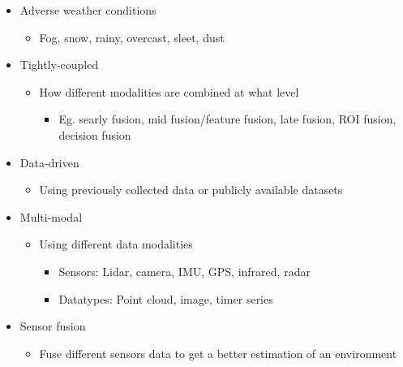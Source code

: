 \documentclass[rnd]{mas_proposal}
\begin{document}
\begin{itemize}
\begin{itemize}
            \item {Adverse weather conditions}
            \begin{itemize}
                \item Fog, snow, rainy, overcast, sleet, dust
            \end{itemize}
        
            \item {Tightly-coupled}
            \begin{itemize}
                \item How different modalities are combined at what level
                \begin{itemize}
                    \item Eg. searly fusion, mid fusion/feature fusion, late fusion, ROI fusion, decision fusion
                \end{itemize}
            \end{itemize}
        
            \item {Data-driven}
            \begin{itemize}
                \item Using previously collected data or publicly available datasets
            \end{itemize}
        
            \item {Multi-modal}
            \begin{itemize}
                \item Using different data modalities
                \begin{itemize}
                    \item Sensors: Lidar, camera, IMU, GPS, infrared, radar
                    \item Datatypes: Point cloud, image, timer series
                \end{itemize}
            \end{itemize}
        
            \item {Sensor fusion}
            \begin{itemize}
                \item Fuse different sensors data to get a better estimation of an environment
            \end{itemize}
        \end{itemize}

\end{itemize}
\end{document}
